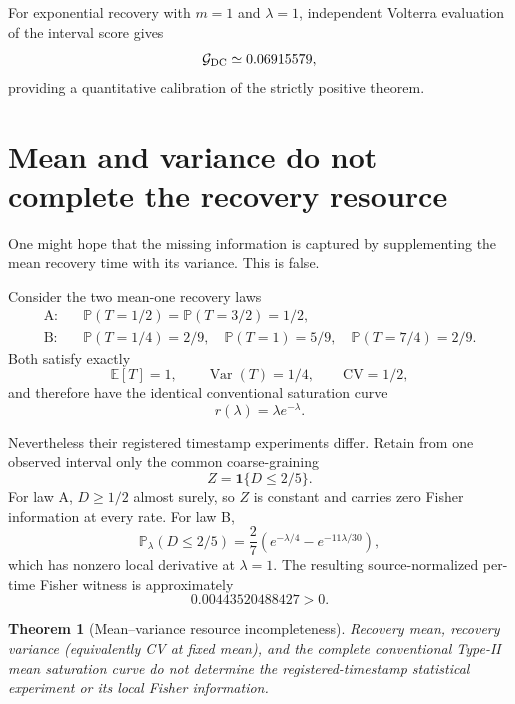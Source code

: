 \documentclass[aps,prapplied,preprint,nofootinbib]{revtex4-2}
\newtheorem{theorem}{Theorem}
\newcommand{\GDC}{\mathcal G_{\rm DC}}
\newcommand{\E}{\mathbb E}
\newcommand{\Prob}{\mathbb P}
\begin{document}
For exponential recovery with $m=1$ and $\lambda=1$, independent Volterra evaluation of the interval score gives
\begin{equation}
\GDC\simeq0.06915579,
\end{equation}
providing a quantitative calibration of the strictly positive theorem.

\section{Mean and variance do not complete the recovery resource}
\label{sec:noGo}

One might hope that the missing information is captured by supplementing the mean recovery time with its variance. This is false.

Consider the two mean-one recovery laws
\begin{align}
\text{A:}\quad &\Prob(T=1/2)=\Prob(T=3/2)=1/2,
\\
\text{B:}\quad &\Prob(T=1/4)=2/9,\quad
\Prob(T=1)=5/9,\quad
\Prob(T=7/4)=2/9.
\end{align}
Both satisfy exactly
\begin{equation}
\E[T]=1,
\qquad
\operatorname{Var}(T)=1/4,
\qquad
\mathrm{CV}=1/2,
\end{equation}
and therefore have the identical conventional saturation curve
\begin{equation}
r(\lambda)=\lambda e^{-\lambda}.
\end{equation}

Nevertheless their registered timestamp experiments differ. Retain from one observed interval only the common coarse-graining
\begin{equation}
Z=\mathbf 1\{D\le2/5\}.
\end{equation}
For law A, $D\ge1/2$ almost surely, so $Z$ is constant and carries zero Fisher information at every rate. For law B,
\begin{equation}
\Prob_\lambda(D\le2/5)
=\frac{2}{7}
\left(e^{-\lambda/4}-e^{-11\lambda/30}\right),
\label{eq:lawBprob}
\end{equation}
which has nonzero local derivative at $\lambda=1$. The resulting source-normalized per-time Fisher witness is approximately
\begin{equation}
0.00443520488427>0.
\end{equation}

\begin{theorem}[Mean--variance resource incompleteness]
\label{thm:varianceNoGo}
Recovery mean, recovery variance (equivalently CV at fixed mean), and the complete conventional Type-II mean saturation curve do not determine the registered-timestamp statistical experiment or its local Fisher information.
\end{theorem}
\end{document}
